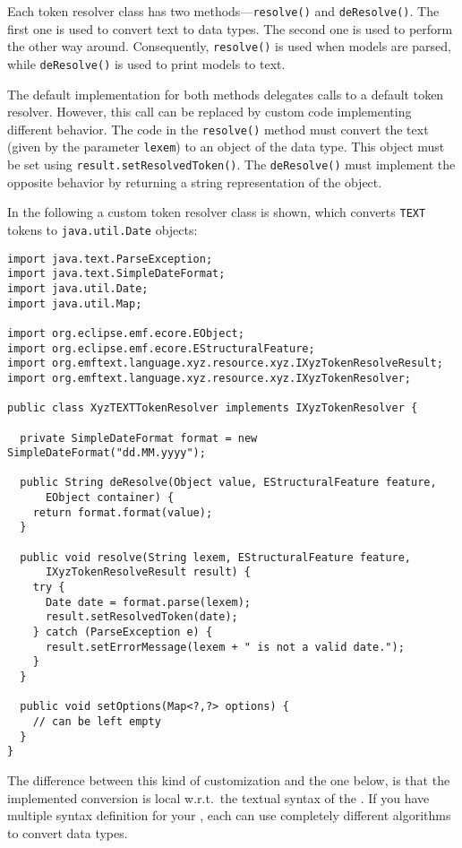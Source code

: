 Each token resolver class has two methods---\texttt{resolve()} and
\texttt{deResolve()}. The first one is used to convert text to data types. The
second one is used to perform the other way around. Consequently,
\texttt{resolve()} is used when models are parsed, while \texttt{deResolve()} is
used to print models to text.

The default implementation for both methods delegates calls to a default token
resolver. However, this call can be replaced by custom code implementing
different behavior. The code in the \texttt{resolve()} method must convert the text
(given by the parameter \texttt{lexem}) to an object of the data type. This
object must be set using \texttt{result.setResolvedToken()}. The
\texttt{deResolve()} must implement the opposite behavior by returning a string 
representation of the object.

In the following a custom token resolver class is shown, which converts
\texttt{TEXT} tokens to \texttt{java.util.Date} objects:

\begin{lstlisting}
import java.text.ParseException;
import java.text.SimpleDateFormat;
import java.util.Date;
import java.util.Map;

import org.eclipse.emf.ecore.EObject;
import org.eclipse.emf.ecore.EStructuralFeature;
import org.emftext.language.xyz.resource.xyz.IXyzTokenResolveResult;
import org.emftext.language.xyz.resource.xyz.IXyzTokenResolver;

public class XyzTEXTTokenResolver implements IXyzTokenResolver {
  
  private SimpleDateFormat format = new SimpleDateFormat("dd.MM.yyyy");
  
  public String deResolve(Object value, EStructuralFeature feature, 
      EObject container) {
    return format.format(value);
  }
  
  public void resolve(String lexem, EStructuralFeature feature, 
      IXyzTokenResolveResult result) {
    try {
      Date date = format.parse(lexem);
      result.setResolvedToken(date);
    } catch (ParseException e) {
      result.setErrorMessage(lexem + " is not a valid date.");
    }
  }
  
  public void setOptions(Map<?,?> options) {
    // can be left empty
  }
}
\end{lstlisting}

The difference between this kind of customization and the one below, is
that the implemented conversion is local w.r.t.~the textual syntax of the \DSL.
If you have multiple syntax definition for your \DSL, each can use completely
different algorithms to convert data types.

